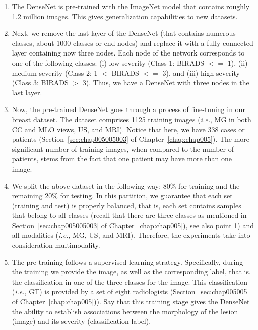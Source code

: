 \begin{enumerate}

\item The DenseNet is pre-trained with the ImageNet model that contains roughly 1.2 million images. This gives generalization capabilities to new datasets.

\vspace{0.50mm}

\item Next, we remove the last layer of the DenseNet (that contains numerous classes, about 1000 classes or end-nodes) and replace it with a fully connected layer containing now three nodes.
Each node of the network corresponds to one of the following classes:
(i) low severity (Class 1: BIRADS $<=$ 1),
(ii) medium severity  (Class 2:  1 $<$ BIRADS $<=$ 3), and
(iii) high severity (Class 3: BIRADS $>$ 3).
Thus, we have a DenseNet with three nodes in the last layer.

\vspace{0.50mm}

\item Now, the pre-trained DenseNet goes through a process of fine-tuning in our breast dataset.
The dataset comprises 1125 training images ({\it i.e.}, \ac{MG} in both \ac{CC} and \ac{MLO} views, \ac{US}, and \ac{MRI}). Notice that here, we have 338 cases or patients (Section~\ref{sec:chap005005003} of Chapter~\ref{chap:chap005}).
The more significant number of training images, when compared to the number of patients, stems from the fact that one patient may have more than one image.

\vspace{0.50mm}

\item We split the above dataset in the following way: 80\% for training and the remaining 20\% for testing.
In this partition, we guarantee that each set (training and test) is properly balanced, that is, each set contains samples that belong to all classes (recall that there are three classes as mentioned in Section~\ref{sec:chap005005003} of Chapter~\ref{chap:chap005}), see also point 1) and all modalities ({\it i.e.}, \ac{MG}, \ac{US}, and \ac{MRI}).
Therefore, the experiments take into consideration multimodality.

\vspace{0.50mm}

\item The pre-training follows a supervised learning strategy.
Specifically, during the training we provide the image, as well as the corresponding label, that is, the classification in one of the three classes for the image.
This classification ({\it i.e.}, \ac{GT}) is provided by a set of eight radiologists (Section~\ref{sec:chap005005} of Chapter~\ref{chap:chap005})).
Say that this training stage gives the DenseNet the ability to establish associations between the morphology of the lesion (image) and its severity (classification label).


\end{enumerate}
